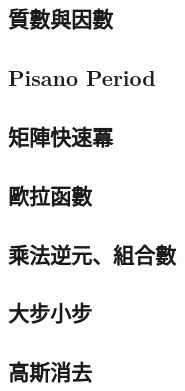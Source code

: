     \subsection{質數與因數}
        
    \subsection{Pisano Period}
        
    \subsection{矩陣快速冪}
        
    \subsection{歐拉函數}
        
    \subsection{乘法逆元、組合數}
        
         \columnbreak
    \subsection{大步小步}
         \columnbreak
    \subsection{高斯消去}
        
        
\clearpage

